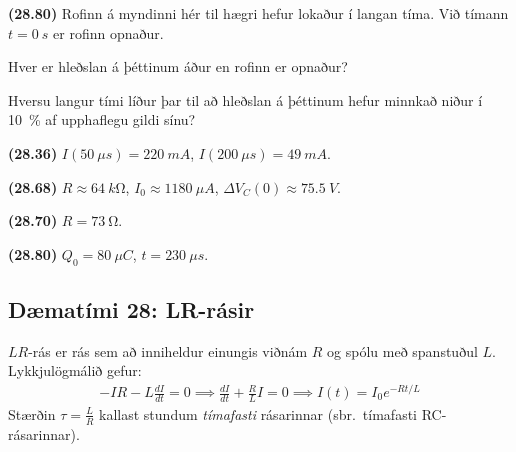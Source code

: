 \ifdefined \wholebook \else\documentclass[oneside]{book}\usepackage{EdlBook}\graphicspath{{figures/}}
\begin{document}
\begin{enumerate}[label = \textbf{(\alph*)}]
\begin{minipage}{\linewidth}
\item[\textbf{(28.80)}] Rofinn á myndinni hér til hægri hefur lokaður í langan tíma. Við tímann $t = \SI{0}{s}$ er rofinn opnaður.  \begin{enumerate*}[label = \textbf{(\alph*)}]
    \item Hver er hleðslan á þéttinum áður en rofinn er opnaður?
    \item Hversu langur tími líður þar til að hleðslan á þéttinum hefur minnkað niður í \SI{10}{\percent} af upphaflegu gildi sínu?
\end{enumerate*}

\end{minipage}

\end{enumerate}

\vspace{2cm}

\begin{tcolorbox}
\begin{enumerate*}[label = ]
  \item \textbf{(28.36)} $I(\SI{50}{\mu s}) = \SI{220}{mA}$, $I(\SI{200}{\mu s}) = \SI{49}{mA}$.
  \item \textbf{(28.68)} $R \approx \SI{64}{k\ohm}$, $I_0 \approx \SI{1180}{\mu A}$, $\Delta V_C(0) \approx \SI{75.5}{V}$.
  \item \textbf{(28.70)} $R = \SI{73}{\ohm}$.
  \item \textbf{(28.80)} $Q_0 = \SI{80}{\mu C}$, $t = \SI{230}{\mu s}$.
\end{enumerate*}
\end{tcolorbox}

\newpage

\subsection*{Dæmatími 28: LR-rásir}

\begin{tcolorbox}
$LR$-rás er rás sem að inniheldur einungis viðnám $R$ og spólu með spanstuðul $L$. Lykkjulögmálið gefur:
\begin{align*}
    - IR - L\frac{dI}{dt} = 0 \implies \frac{dI}{dt} + \frac{R}{L} I = 0 \implies I(t) = I_0e^{-Rt/L}
\end{align*}
Stærðin $\tau = \frac{L}{R}$ kallast stundum \emph{tímafasti} rásarinnar (sbr.~tímafasti RC-rásarinnar).
\end{tcolorbox}
\end{document}
